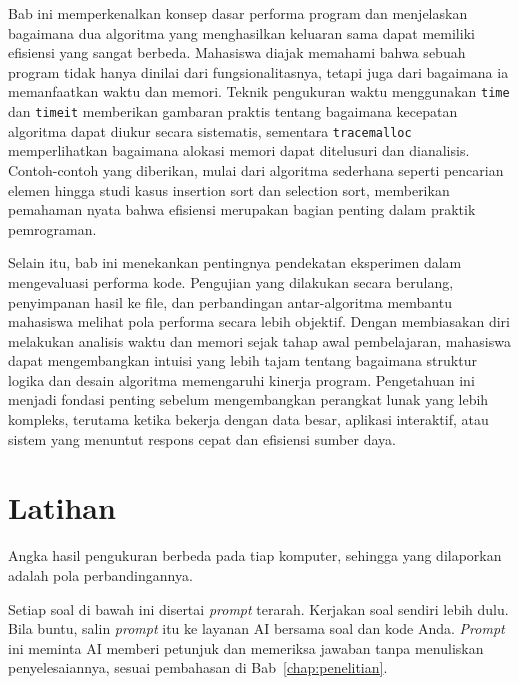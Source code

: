 Bab ini memperkenalkan konsep dasar performa program dan menjelaskan bagaimana dua algoritma yang menghasilkan keluaran sama dapat memiliki efisiensi yang sangat berbeda. Mahasiswa diajak memahami bahwa sebuah program tidak hanya dinilai dari fungsionalitasnya, tetapi juga dari bagaimana ia memanfaatkan waktu dan memori. Teknik pengukuran waktu menggunakan \texttt{time} dan \texttt{timeit} memberikan gambaran praktis tentang bagaimana kecepatan algoritma dapat diukur secara sistematis, sementara \texttt{tracemalloc} memperlihatkan bagaimana alokasi memori dapat ditelusuri dan dianalisis. Contoh-contoh yang diberikan, mulai dari algoritma sederhana seperti pencarian elemen hingga studi kasus insertion sort dan selection sort, memberikan pemahaman nyata bahwa efisiensi merupakan bagian penting dalam praktik pemrograman.

Selain itu, bab ini menekankan pentingnya pendekatan eksperimen dalam mengevaluasi performa kode. Pengujian yang dilakukan secara berulang, penyimpanan hasil ke file, dan perbandingan antar-algoritma membantu mahasiswa melihat pola performa secara lebih objektif. Dengan membiasakan diri melakukan analisis waktu dan memori sejak tahap awal pembelajaran, mahasiswa dapat mengembangkan intuisi yang lebih tajam tentang bagaimana struktur logika dan desain algoritma memengaruhi kinerja program. Pengetahuan ini menjadi fondasi penting sebelum mengembangkan perangkat lunak yang lebih kompleks, terutama ketika bekerja dengan data besar, aplikasi interaktif, atau sistem yang menuntut respons cepat dan efisiensi sumber daya.

\section{Latihan}
Angka hasil pengukuran berbeda pada tiap komputer, sehingga yang dilaporkan adalah pola perbandingannya.

Setiap soal di bawah ini disertai \textit{prompt} terarah. Kerjakan soal sendiri lebih dulu. Bila buntu, salin \textit{prompt} itu ke layanan AI bersama soal dan kode Anda. \textit{Prompt} ini meminta AI memberi petunjuk dan memeriksa jawaban tanpa menuliskan penyelesaiannya, sesuai pembahasan di Bab~\ref{chap:penelitian}.

